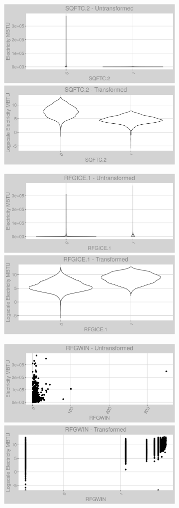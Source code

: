 \newpage
\begin{figure}
\centering
\begin{subfigure}{1\textwidth}
\centering
\includegraphics[width=.49\textwidth, height=0.3\textheight]{Images/electricity_var_original_5.png}
\includegraphics[width=.49\textwidth, height=0.3\textheight]{Images/electricity_var_transformed_5.png}
\end{subfigure}
\begin{subfigure}{1\textwidth}
\centering
\includegraphics[width=.49\textwidth, height=0.3\textheight]{Images/electricity_var_original_6.png}
\includegraphics[width=.49\textwidth, height=0.3\textheight]{Images/electricity_var_transformed_6.png}
\end{subfigure}
\begin{subfigure}{1\textwidth}
\centering
\includegraphics[width=.49\textwidth, height=0.3\textheight]{Images/electricity_var_original_7.png}
\includegraphics[width=.49\textwidth, height=0.3\textheight]{Images/electricity_var_transformed_7.png}
\end{subfigure}
\end{figure}

